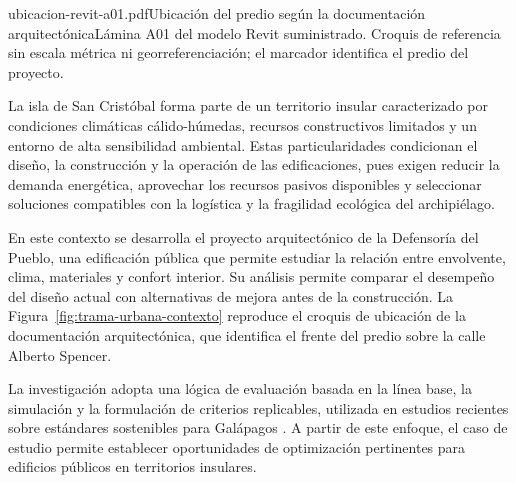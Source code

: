 \begin{landscape}
\hypersetup{citecolor=pilotoCoral,linkcolor=pilotoCoral,urlcolor=pilotoCoral}

\pagestyle{empty}

\begin{pilotoTextoImagen}{ubicacion-revit-a01.pdf}{Ubicación del predio según la documentación arquitectónica\label{fig:trama-urbana-contexto}}{Lámina A01 del modelo Revit suministrado. Croquis de referencia sin escala métrica ni georreferenciación; el marcador identifica el predio del proyecto.}

La isla de San Cristóbal forma parte de un territorio insular caracterizado por condiciones climáticas cálido-húmedas, recursos constructivos limitados y un entorno de alta sensibilidad ambiental. Estas particularidades condicionan el diseño, la construcción y la operación de las edificaciones, pues exigen reducir la demanda energética, aprovechar los recursos pasivos disponibles y seleccionar soluciones compatibles con la logística y la fragilidad ecológica del archipiélago.

En este contexto se desarrolla el proyecto arquitectónico de la Defensoría del Pueblo, una edificación pública que permite estudiar la relación entre envolvente, clima, materiales y confort interior. Su análisis permite comparar el desempeño del diseño actual con alternativas de mejora antes de la construcción. La Figura~\ref{fig:trama-urbana-contexto} reproduce el croquis de ubicación de la documentación arquitectónica, que identifica el frente del predio sobre la calle Alberto Spencer.

La investigación adopta una lógica de evaluación basada en la línea base, la simulación y la formulación de criterios replicables, utilizada en estudios recientes sobre estándares sostenibles para Galápagos \parencite{torres-barriusoSustainableBuildingStandards2025}. A partir de este enfoque, el caso de estudio permite establecer oportunidades de optimización pertinentes para edificios públicos en territorios insulares.
\end{pilotoTextoImagen}



\end{landscape}
